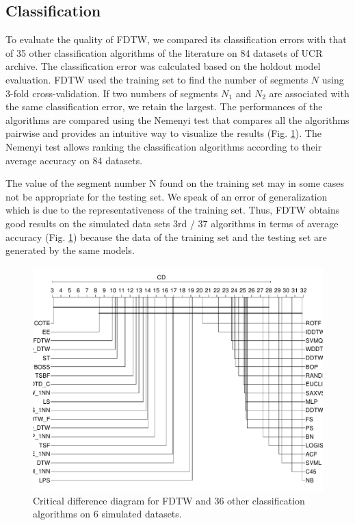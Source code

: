 \subsection{Classification}
To evaluate the quality of FDTW, we compared its classification errors with that of 35 other classification algorithms \cite{bagnall2016great} of the literature on 84 datasets of UCR archive{{}}.
The classification error  was calculated  based on the holdout model evaluation. FDTW used
the training set to find the number of segments $N$ using 3-fold cross-validation. If two
numbers of segments $N_1$ and $N_2$ are associated with the same classification error, we retain the
largest. The performances of the algorithms are compared using 
the Nemenyi test that compares all the algorithms pairwise and  provides an intuitive way to
visualize the results (Fig. \ref{cd2}). The Nemenyi test allows ranking the classification algorithms according to their average accuracy on 84 datasets.


The value of the segment number N found on the training set may in some cases not be appropriate for the testing set. We speak of an error of generalization which is due to the representativeness of the training set. Thus, FDTW obtains good results on the simulated data sets 3rd / 37 algorithms in terms of average accuracy (Fig. \ref{cd2}) because the data of the training set and the testing set are generated by the same models.

\begin{figure}
\centering
\includegraphics[scale=0.23]{images/cd1}
\caption{Critical difference diagram for FDTW and $36$ other classification algorithms on 6 simulated datasets.}

\label{cd2}
\end{figure}



